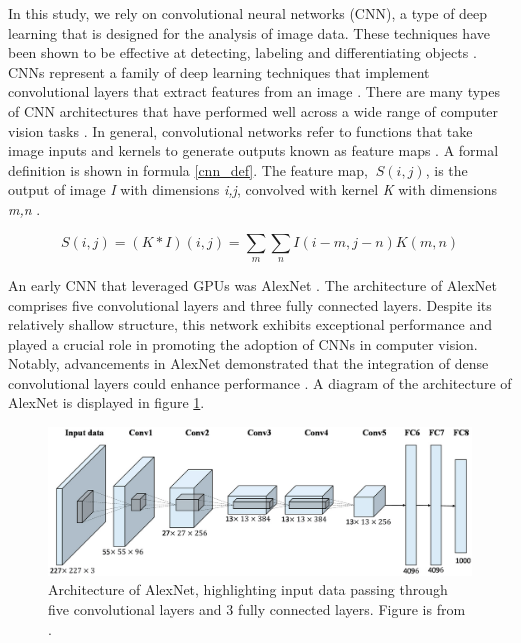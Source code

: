 In this study, we rely on convolutional neural networks (CNN), a type of deep learning that is designed for the analysis of image data. These techniques have been shown to be effective at detecting, labeling and differentiating objects \citep{simonyan2014very, zhang2016deep, he2016deep, krizhevsky2017imagenet, voulodimos2018deep}.  CNNs represent a family of deep learning techniques that implement convolutional layers that extract features from an image \citep{zhang2016deep}.  There are many types of CNN architectures that have performed well across a wide range of computer vision tasks \citep{voulodimos2018deep,simonyan2014very,szegedy2015going}.  In general, convolutional networks refer to functions that take image inputs and kernels to generate outputs known as feature maps \citep{goodfellow2016deep}.  A formal definition is shown in formula \ref{cnn_def}.  The feature map, $\ S(i,j)$, is the output of image \textit{I} with dimensions \textit{i,j}, convolved with kernel \textit{K} with dimensions \textit{m,n} \citep{goodfellow2016deep}.  

\begin{equation}
S(i,j) = (K * I)(i,j) = \sum_{m} \sum_{n} I(i-m,j-n)K(m,n) 
\label{cnn_def}
\end{equation}

An early CNN  that leveraged GPUs was AlexNet \citep{krizhevsky2017imagenet}.  The architecture of AlexNet comprises five convolutional layers and three fully connected layers. Despite its relatively shallow structure, this network exhibits exceptional performance and played a crucial role in promoting the adoption of CNNs in computer vision. Notably, advancements in AlexNet demonstrated that the integration of dense convolutional layers could enhance performance \citep{szegedy2015going}.  A diagram of the architecture of AlexNet is displayed in figure \ref{fig:alexnet_architecture}.  

\begin{figure}
    \centering
    \includegraphics[width=0.5\linewidth]{Figures/alexnet_architecture.png}
    \caption{Architecture of AlexNet, highlighting input data passing through five convolutional layers and 3 fully connected layers.  Figure is from \citep{han2017pre}.}
    \label{fig:alexnet_architecture}
\end{figure}

